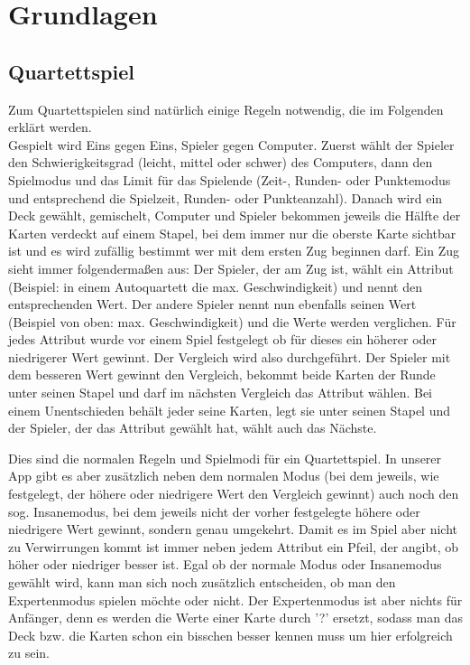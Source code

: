 \chapter{Grundlagen}
\label{cha:grundlagen}

\section{Quartettspiel}
\label{sec:grundlagen:quartettspiel}

Zum Quartettspielen sind natürlich einige Regeln notwendig, die im Folgenden erklärt werden. \\
Gespielt wird Eins gegen Eins, Spieler gegen Computer. Zuerst wählt der Spieler den Schwierigkeitsgrad (leicht, mittel oder schwer) des Computers, dann den Spielmodus und das Limit für das Spielende (Zeit-, Runden- oder Punktemodus und entsprechend die Spielzeit, Runden- oder Punkteanzahl). Danach wird ein Deck gewählt, gemischelt, Computer und Spieler bekommen jeweils die Hälfte der Karten verdeckt auf einem Stapel, bei dem immer nur die oberste Karte sichtbar ist und es wird zufällig bestimmt wer mit dem ersten Zug beginnen darf. Ein Zug sieht immer folgendermaßen aus: Der Spieler, der am Zug ist, wählt ein Attribut (Beispiel: in einem Autoquartett die max. Geschwindigkeit) und nennt den entsprechenden Wert. Der andere Spieler nennt nun ebenfalls seinen Wert (Beispiel von oben: max. Geschwindigkeit) und die Werte werden verglichen. Für jedes Attribut wurde vor einem Spiel festgelegt ob für dieses ein höherer oder niedrigerer Wert gewinnt. Der Vergleich wird also durchgeführt. Der Spieler mit dem besseren Wert gewinnt den Vergleich, bekommt beide Karten der Runde unter seinen Stapel und darf im nächsten Vergleich das Attribut wählen. Bei einem Unentschieden behält jeder seine Karten, legt sie unter seinen Stapel und der Spieler, der das Attribut gewählt hat, wählt auch das Nächste.

Dies sind die normalen Regeln und Spielmodi für ein Quartettspiel. In unserer App gibt es aber zusätzlich neben dem normalen Modus (bei dem jeweils, wie festgelegt, der höhere oder niedrigere Wert den Vergleich gewinnt) auch noch den sog. Insanemodus, bei dem jeweils nicht der vorher festgelegte höhere oder niedrigere Wert gewinnt, sondern genau umgekehrt. Damit es im Spiel aber nicht zu Verwirrungen kommt ist immer neben jedem Attribut ein Pfeil, der angibt, ob höher oder niedriger besser ist. 
Egal ob der normale Modus oder Insanemodus gewählt wird, kann man sich noch zusätzlich entscheiden, ob man den Expertenmodus spielen möchte oder nicht. Der Expertenmodus ist aber nichts für Anfänger, denn es werden die Werte einer Karte durch '?' ersetzt, sodass man das Deck bzw. die Karten schon ein bisschen besser kennen muss um hier erfolgreich zu sein.


